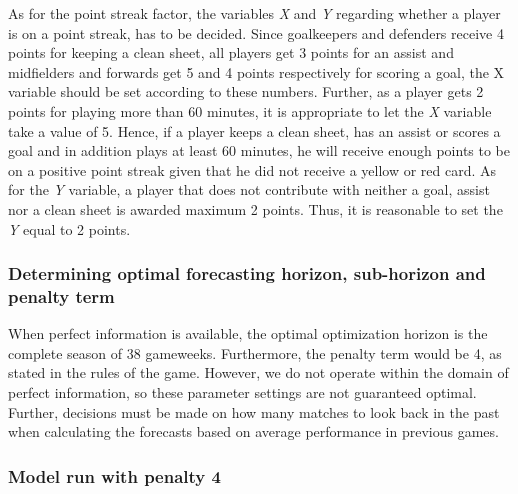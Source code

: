 As for the point streak factor, the variables \textit{X} and \textit{Y} regarding whether a player is on a point streak, has to be decided. Since goalkeepers and defenders receive 4 points for keeping a clean sheet, all players get 3 points for an assist and midfielders and forwards get 5 and 4 points respectively for scoring a goal, the X variable should be set according to these numbers. Further, as a player gets 2 points for playing more than 60 minutes, it is appropriate to let the \textit{X} variable take a value of 5. Hence, if a player keeps a clean sheet, has an assist or scores a goal and in addition plays at least 60 minutes, he will receive enough points to be on a positive point streak given that he did not receive a yellow or red card. As for the \textit{Y} variable, a player that does not contribute with neither a goal, assist nor a clean sheet is awarded maximum 2 points. Thus, it is reasonable to set the \textit{Y} equal to 2 points. 


\subsubsection{Determining optimal forecasting horizon, sub-horizon and penalty term}

When perfect information is available, the optimal optimization horizon is the complete season of 38 gameweeks. Furthermore, the penalty term would be 4, as stated in the rules of the game. However, we do not operate within the domain of perfect information, so these parameter settings are not guaranteed optimal. Further, decisions must be made on how many matches to look back in the past when calculating the forecasts based on average performance in previous games.

\subsubsection{Model run with penalty 4}


